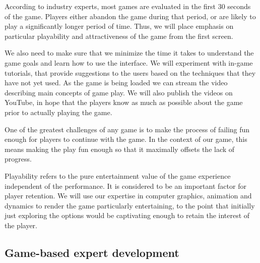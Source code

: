 \documentclass{sig-alternate}
\let\Description =\description
\def\Nospacing{\itemsep=0pt\topsep=0pt\partopsep=0pt\parskip=0pt\parsep=0pt}
\renewenvironment{description}{\Description\Nospacing}{\endlist}
\begin{document}
\begin{description}
\item[Focus on the first 30 seconds.] According to industry experts,
  most games are evaluated in the first 30 seconds of the
  game. Players either abandon the game during that period, or are
  likely to play a significantly longer period of time. Thus, we will
  place emphasis on particular playability and attractiveness of the
  game from the first screen.

\item[Minimize startup curve.] We also need to make sure that we
  minimize the time it takes to understand the game goals and learn
  how to use the interface. We will experiment with in-game tutorials,
  that provide suggestions to the users based on the techniques that
  they have not yet used.  As the game is being loaded we can stream
  the video describing main concepts of game play. We will also
  publish the videos on YouTube, in hope that the players know as much
  as possible about the game prior to actually playing the game.

\item[Making failing fun.] One of the greatest challenges of any game
  is to make the process of failing fun enough for players to continue
  with the game. In the context of our game, this means making the
  play fun enough so that it maximally offsets the lack of progress.

\item[Playability.] Playability refers to the pure entertainment value
  of the game experience independent of the performance. It is
  considered to be an important factor for player retention. We will
  use our expertise in computer graphics, animation and dynamics to
  render the game particularly entertaining, to the point that
  initially just exploring the options would be captivating enough to
  retain the interest of the player.
\end{description}


\subsection{Game-based expert development}
\label{sec:expert-development}
\end{document}
